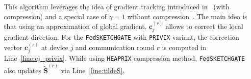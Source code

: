\documentclass[twoside]{article}
\begin{document}
This algorithm leverages the idea of gradient tracking introduced in~\cite{haddadpour2020federated} (with compression) and a special case of $\gamma=1$ without compression~\cite{liang2019variance}. 
The main idea is that using an approximation of global gradient, $\mathbf{c}_j^{(r)}$ allows to correct the local gradient direction. 
For the \texttt{FedSKETCHGATE} with \texttt{PRIVIX} variant, the correction vector $\mathbf{c}_j^{(r)}$ at device $j$ and communication round $r$ is computed in Line~\ref{line:cj_privix}. 
While using \texttt{HEAPRIX} compression method, \texttt{FedSKETCHGATE} also updates $\tilde{\mathbf{S}}^{(r)}$ via Line~\ref{line:tildeS}.
\end{document}

